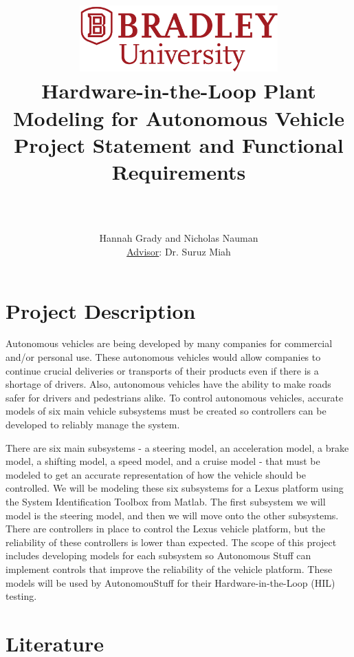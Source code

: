 \documentclass[12pt]{article} %
\title{
    \begin{center}
        \href{http://www.bradley.edu}{\includegraphics[height=1in]{figs/logoBU1-Print}}
        \vskip10pt
        \HRule \\[0.4cm]
        {\Huge \bfseries Hardware-in-the-Loop Plant Modeling for Autonomous Vehicle \\\Large Project Statement and Functional Requirements}\\[0.4cm] %
        \HRule \\[0.4cm]
    \end{center}
    }
\author{Hannah Grady and Nicholas Nauman \\ \underline{Advisor}: Dr. Suruz Miah}
\begin{document}
\maketitle

\newpage %

\section{Project Description}
Autonomous vehicles are being developed by many companies for commercial and/or personal use. These autonomous vehicles would allow companies to continue crucial deliveries or transports of their products even if there is a shortage of drivers. Also, autonomous vehicles have the ability to make roads safer for drivers and pedestrians alike. To control autonomous vehicles, accurate models of six main vehicle subsystems must be created so controllers can be developed to reliably manage the system.

There are six main subsystems - a steering model, an acceleration model, a brake
model, a shifting model, a speed model, and a cruise model - that must be
modeled to get an accurate representation of how the vehicle should be
controlled. We will be modeling these six subsystems for a Lexus platform using
the System Identification Toolbox from Matlab. The first subsystem we will model is the steering model, and then we will move onto the other subsystems. There are controllers in place to control the Lexus vehicle platform, but the reliability of these controllers is lower than expected. The scope of this project includes developing models for each subsystem so Autonomous Stuff can implement controls that improve the reliability of the vehicle platform. These models will be used by AutonomouStuff for their Hardware-in-the-Loop (HIL) testing. 


\section{Literature}
\label{sec:Literature}
\end{document}
